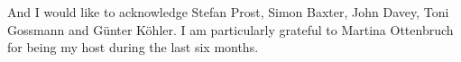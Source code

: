 
\begin{acknowledgements}      


And I would like to acknowledge Stefan Prost, Simon Baxter, John Davey, Toni Gossmann and G\"{u}nter K\"{o}hler. I am particularly grateful to Martina Ottenbruch for being my host during the last six months.


\end{acknowledgements}
